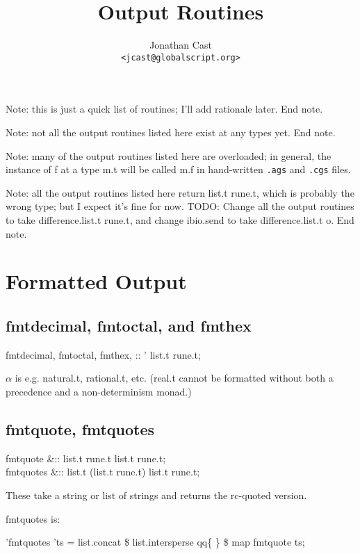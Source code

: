 \documentclass{article}
\title{Output Routines}
\author{Jonathan Cast\\\texttt{<jcast@globalscript.org>}}
\begin{document}
\maketitle

Note: this is just a quick list of routines; I'll add rationale later.  End note.

Note: not all the output routines listed here exist at any types yet.  End note.

Note: many of the output routines listed here are overloaded;
in general, the instance of \<f\> at a type \<m.t\> will be called \<m.f\> in hand-written \texttt{.ags} and \texttt{.cgs} files.

Note: all the output routines listed here return \<list.t rune.t\>, which is probably the wrong type;
but I expect it's fine for now.
TODO: Change all the output routines to take \<difference.list.t rune.t\>,
and change \<ibio.send\> to take \<difference.list.t o\>.
End note.

\section{Formatted Output}

\subsection{\<fmtdecimal\>, \<fmtoctal\>, and \<fmthex\>}

\begin{haskell}
    fmtdecimal, fmtoctal, fmthex, :: '\alpha{} \to{} list.t rune.t;
\end{haskell}
$\alpha$ is e.g. \<natural.t\>, \<rational.t\>, etc.
(\<real.t\> cannot be formatted without both a precedence and a non-determinism monad.)

\subsection{\<fmtquote\>, \<fmtquotes\>}
\begin{haskell}
    fmtquote &:: list.t rune.t \to{} list.t rune.t; \\
    fmtquotes &:: list.t (list.t rune.t) \to{} list.t rune.t;
\end{haskell}
These take a string or list of strings and returns the rc-quoted version.

\<fmtquotes\> is:
\begin{haskell}
    'fmtquotes 'ts = list.concat \$ list.intersperse qq\{ \} \$ map fmtquote ts;
\end{haskell}
\end{document}
